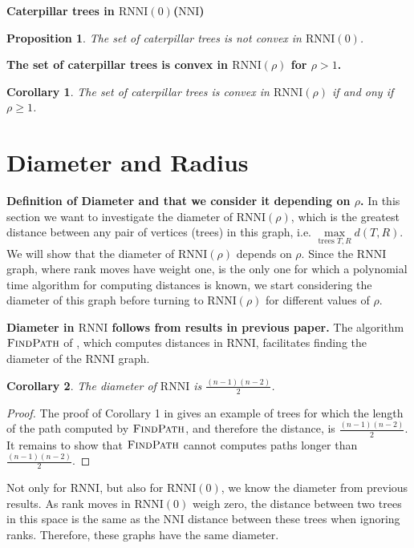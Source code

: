 \documentclass[11pt]{amsart}
\newtheorem{proposition}{Proposition}
\newtheorem{corollary}{Corollary}
\newcommand{\rnni}{\mathrm{RNNI}}
\newcommand{\findpath}{\textsc{FindPath}}
\newcommand{\nni}{\mathrm{NNI}}
\newcommand{\summary}[1]{\textbf{#1}} %
\begin{document}
\summary{Caterpillar trees in $\rnni(0)$($\nni$)}
\begin{proposition}
	The set of caterpillar trees is not convex in $\rnni(0)$.
\end{proposition}

\summary{The set of caterpillar trees is convex in $\rnni(\rho)$ for $\rho > 1$.}
\begin{corollary}
	The set of caterpillar trees is convex in $\rnni(\rho)$ if and ony if $\rho \geq 1$.
\end{corollary}


\section{Diameter and Radius}

\summary{Definition of Diameter and that we consider it depending on $\rho$.}
In this section we want to investigate the diameter of $\rnni(\rho)$, which is the greatest distance between any pair of vertices (trees) in this graph, i.e. $\max\limits_{\text{trees }T,R}d(T,R)$.
We will show that the diameter of $\rnni(\rho)$ depends on $\rho$.
Since the $\rnni$ graph, where rank moves have weight one, is the only one for which a polynomial time algorithm for computing distances is known, we start considering the diameter of this graph before turning to $\rnni(\rho)$ for different values of $\rho$.

\summary{Diameter in $\rnni$ follows from results in previous paper.}
The algorithm $\findpath$ of \autocite{collienne2020computing}, which computes distances in $\rnni$, facilitates finding the diameter of the $\rnni$ graph. 
\begin{corollary}
	The diameter of $\rnni$ is $\frac{(n-1)(n-2)}{2}$.
	\label{cor:diameter_rnni}
\end{corollary}

\begin{proof}
	The proof of Corollary 1 in \autocite{collienne2020computing} gives an example of trees for which the length of the path computed by $\findpath$, and therefore the distance, is $\frac{(n-1)(n-2)}{2}$.
	It remains to show that $\findpath$ cannot computes paths longer than $\frac{(n-1)(n-2)}{2}$.
\end{proof}

Not only for $\rnni$, but also for $\rnni(0)$, we know the diameter from previous results.
As rank moves in $\rnni(0)$ weigh zero, the distance between two trees in this space is the same as the $\nni$ distance between these trees when ignoring ranks.
Therefore, these graphs have the same diameter.
\end{document}

